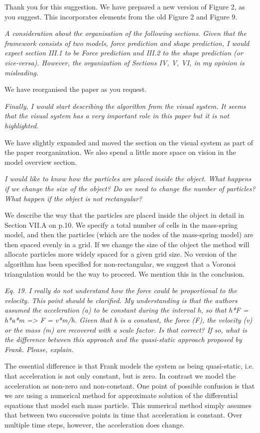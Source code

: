 \documentclass[letterpaper,12pt]{letter}
\begin{document}
Thank you for this suggestion. We have prepared a new version of Figure 2, as you suggest. This incorporates elements from the old Figure 2 and Figure 9.

\emph{A consideration about the organisation of the following sections. Given that the framework consists of two models, force prediction and shape prediction, I would expect section III.1 to be Force prediction and III.2 to the shape prediction (or vice-versa). However, the organization of Sections IV, V, VI, in my opinion is misleading.}

We have reorganised the paper as you request.

\emph{Finally, I would start describing the algorithm from the visual system. It seems that the visual system has a very important role in this paper but it is not highlighted.}
 
We have slightly expanded and moved the section on the visual system as part of the paper reorganization. We also spend a little more space on vision in the model overview section. 

\emph{I would like to know how the particles are placed inside the object. What happens if we change the size of the object? Do we need to change the number of particles? What happen if the object is not rectangular?}

We describe the way that the particles are placed inside the object in detail in Section VII.A on p.10. We specify a total number of cells in the mass-spring model, and then the particles (which are the nodes of the mass-spring model) are then spaced evenly in a grid. If we change the size of the object the method will allocate particles more widely spaced for a given grid size. No version of the algorithm has been specified for non-rectangular, we suggest that a Voronoi triangulation would be the way to proceed. We mention this in the conclusion.

\emph{Eq. 19. I really do not understand how the force could be proportional to the velocity. This point should be clarified. My understanding is that the authors assumed the acceleration (a) to be constant during the interval h, so that h*F = h*a*m => F = v*m/h. Given that h is a constant, the force (F), the velocity (v) or the mass (m) are recovered with a scale factor. Is that correct? If so, what is the difference between this approach and the quasi-static approach proposed by Frank. Please, explain.}

The essential difference is that Frank models the system as being quasi-static, i.e. that acceleration is not only constant, but is zero. In contrast we model the acceleration as non-zero and non-constant. One point of possible confusion is that we are using a numerical method for approximate solution of the differential equations that model each mass particle. This numerical method simply assumes that between two successive points in time that acceleration is constant. Over multiple time steps, however, the acceleration does change.
\end{document}
